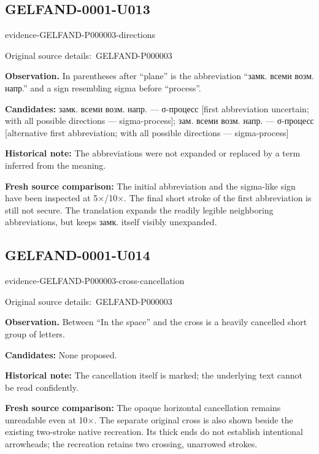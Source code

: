 \documentclass[11pt]{article}
\newcommand{\EvidenceBlock}[4]{%
 \par\smallskip\noindent\begin{minipage}{\linewidth}
 \begin{minipage}[t]{.47\linewidth}\vspace{0pt}\centering
 \csname evidence-#1-#2\endcsname\par
 {\scriptsize\SourceCropCaption\ #1}\par
 \end{minipage}\hfill
 \begin{minipage}[t]{.49\linewidth}\vspace{0pt}\raggedright
 {\small\color{orange!65!black}\textbf{#4} #3}\par
 \end{minipage}
 \end{minipage}\par\smallskip}
\newcommand{\SourceCropCaption}{Original source details:}\newcommand{\ReadingCaption}{Uncertain reading.}\newcommand{\IncompleteCaption}{Undeciphered passage.}\newcommand{\DiagramCaption}{Diagram and typed description.}
\begin{document}
\subsection*{GELFAND-0001-U013}
\EvidenceBlock{GELFAND-P000003}{directions}{In parentheses after “plane” is the abbreviation “замк. всеми возм. напр.” and a sign resembling sigma before “process”.}{Observation.}
\par\smallskip\noindent\textbf{Candidates: } замк. всеми возм. напр. — σ-процесс [first abbreviation uncertain; with all possible directions — sigma-process]; зам. всеми возм. напр. — σ-процесс [alternative first abbreviation; with all possible directions — sigma-process]\par
\par\smallskip\noindent\textbf{Historical note: } The abbreviations were not expanded or replaced by a term inferred from the meaning.\par
\par\smallskip\noindent\textbf{Fresh source comparison: } The initial abbreviation and the sigma-like sign have been inspected at 5×/10×. The final short stroke of the first abbreviation is still not secure. The translation expands the readily legible neighboring abbreviations, but keeps замк. itself visibly unexpanded.\par

\subsection*{GELFAND-0001-U014}
\EvidenceBlock{GELFAND-P000003}{cross-cancellation}{Between “In the space” and the cross is a heavily cancelled short group of letters.}{Observation.}
\par\smallskip\noindent\textbf{Candidates: } None proposed.\par
\par\smallskip\noindent\textbf{Historical note: } The cancellation itself is marked; the underlying text cannot be read confidently.\par
\par\smallskip\noindent\textbf{Fresh source comparison: } The opaque horizontal cancellation remains unreadable even at 10×. The separate original cross is also shown beside the existing two-stroke native recreation. Its thick ends do not establish intentional arrowheads; the recreation retains two crossing, unarrowed strokes.\par
\end{document}
